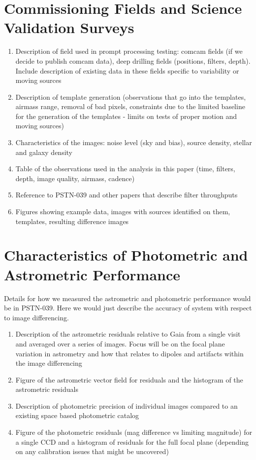 \section{Commissioning Fields and Science Validation Surveys}
\label{sec:fields}

\begin{enumerate}

    \item Description of field used in prompt processing testing: comcam fields (if we decide to publish comcam data), 
    deep drilling fields (positions, filters, depth). Include description of existing data in these fields specific to variability 
    or moving sources
    \item Description of template generation (observations that go into the templates, airmass range, removal of bad pixels, constraints due to 
    the limited baseline for the generation of the templates - limits on tests of proper motion and moving sources)
    \item Characteristics of the images: noise level (sky and bias), source density, stellar and galaxy density 
    \item Table of the observations used in the analysis in this paper (time, filters, depth, image quality, airmass, cadence)
    \item Reference to PSTN-039 and other papers that describe filter throughputs
    \item Figures showing example data, images with sources identified on them, templates, resulting difference images

\end{enumerate}


\section{Characteristics of Photometric and Astrometric Performance}

Details for how we measured the astrometric and photometric performance would be in PSTN-039. Here we would just describe the 
accuracy of system with respect to  image differencing.

\begin{enumerate}

    \item Description of the astrometric residuals relative to Gaia from a single visit and averaged over a series of images. Focus will be 
    on the focal plane variation in astrometry and how that relates to dipoles and artifacts within the image differencing
    \item Figure of the astrometric vector field for residuals and the histogram of the astrometric residuals
    \item Description of photometric precision of individual images compared to an existing space based photometric catalog
    \item Figure of the photometric residuals (mag difference vs limiting magnitude) for a single CCD and a histogram of residuals for the full focal plane
     (depending on any calibration issues that might be uncovered)

\end{enumerate}

